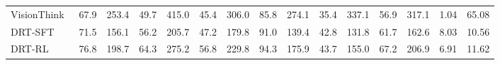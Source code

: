 \begin{table}[t]
{\begin{tabular}{lcccccccccccccc}
VisionThink~\cite{yang2025visionthink}
& 67.9 & 253.4
& 49.7 & 415.0
& 45.4 & 306.0
& 85.8 & 274.1
& 35.4   & 337.1
& 56.9   & 317.1
& 1.04 & 65.08 \\

DRT-SFT
& 71.5 & 156.1
& 56.2 & 205.7
& 47.2 & 179.8
& 91.0 & 139.4
& 42.8   & 131.8
& 61.7   & 162.6
& 8.03 & 10.56  \\

DRT-RL
& 76.8 & 198.7
& 64.3 & 275.2
& 56.8 & 229.8
& 94.3 & 175.9
& 43.7   & 155.0
& 67.2   & 206.9
& 6.91 & 11.62  \\
\bottomrule
\end{tabular}
}
\label{tab:main_results}
\vspace{-5mm}
\end{table}